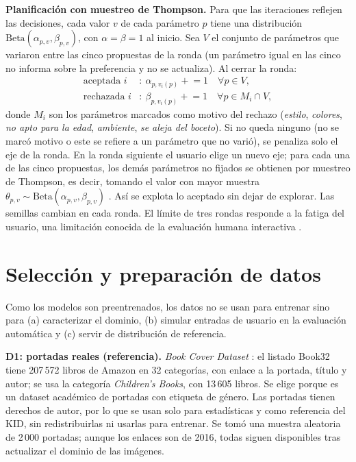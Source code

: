 \documentclass[10pt,a4paper,twocolumn]{article}
\begin{document}
\textbf{Planificación con muestreo de Thompson.} Para que las iteraciones reflejen las decisiones, cada valor $v$ de cada parámetro $p$ tiene una distribución $\mathrm{Beta}(\alpha_{p,v},\beta_{p,v})$, con $\alpha=\beta=1$ al inicio. Sea $V$ el conjunto de parámetros que variaron entre las cinco propuestas de la ronda (un parámetro igual en las cinco no informa sobre la preferencia y no se actualiza). Al cerrar la ronda:
\begin{equation}
\begin{aligned}
\text{aceptada } i &: \ \alpha_{p,v_i(p)} \mathrel{+}= 1 \quad \forall p\in V,\\
\text{rechazada } i &: \ \beta_{p,v_i(p)} \mathrel{+}= 1 \quad \forall p\in M_i\cap V,
\end{aligned}
\end{equation}
donde $M_i$ son los parámetros marcados como motivo del rechazo (\emph{estilo}, \emph{colores}, \emph{no apto para la edad}, \emph{ambiente}, \emph{se aleja del boceto}). Si no queda ninguno (no se marcó motivo o este se refiere a un parámetro que no varió), se penaliza solo el eje de la ronda. En la ronda siguiente el usuario elige un nuevo eje; para cada una de las cinco propuestas, los demás parámetros no fijados se obtienen por muestreo de Thompson, es decir, tomando el valor con mayor muestra $\theta_{p,v}\sim\mathrm{Beta}(\alpha_{p,v},\beta_{p,v})$ \citep{russo2018,sutton2018}. Así se explota lo aceptado sin dejar de explorar. Las semillas cambian en cada ronda. El límite de tres rondas responde a la fatiga del usuario, una limitación conocida de la evaluación humana interactiva \citep{takagi2001}.

\section{Selección y preparación de datos}\label{sec:datos}
Como los modelos son preentrenados, los datos no se usan para entrenar sino para (a) caracterizar el dominio, (b) simular entradas de usuario en la evaluación automática y (c) servir de distribución de referencia.

\textbf{D1: portadas reales (referencia).} \emph{Book Cover Dataset} \citep{iwana2016}: el listado Book32 tiene 207\,572 libros de Amazon en 32 categorías, con enlace a la portada, título y autor; se usa la categoría \emph{Children's Books}, con 13\,605 libros. Se elige porque es un dataset académico de portadas con etiqueta de género. Las portadas tienen derechos de autor, por lo que se usan solo para estadísticas y como referencia del KID, sin redistribuirlas ni usarlas para entrenar. Se tomó una muestra aleatoria de 2\,000 portadas; aunque los enlaces son de 2016, todas siguen disponibles tras actualizar el dominio de las imágenes.
\end{document}
